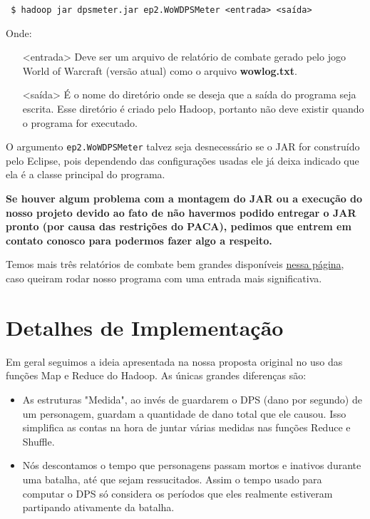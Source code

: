 \documentclass[a4paper,11pt]{article}
\begin{document}
  \begin{verbatim} $ hadoop jar dpsmeter.jar ep2.WoWDPSMeter <entrada> <saída> \end{verbatim}
  
  Onde:
  
  \begin{itemize}
    \item[<entrada>]
      Deve ser um arquivo de relatório de combate gerado pelo jogo World of
      Warcraft (versão atual) como o arquivo \textbf{wowlog.txt}.
    \item[<saída>]
      É o nome do diretório onde se deseja que a saída do programa seja escrita.
      Esse diretório é criado pelo Hadoop, portanto não deve existir quando o
      programa for executado.
  \end{itemize}
  
  O argumento \verb$ep2.WoWDPSMeter$ talvez seja desnecessário se o JAR for
  construído pelo Eclipse, pois dependendo das configurações usadas ele já deixa
  indicado que ela é a classe principal do programa.
  
  \textbf{
  Se houver algum problema com a montagem do JAR ou a execução do nosso projeto
  devido ao fato de não havermos podido entregar o JAR pronto (por causa das
  restrições do PACA), pedimos que entrem em contato conosco para podermos fazer
  algo a respeito.
  }
  
  Temos mais três relatórios de combate bem grandes disponíveis
  \href{http://www.linux.ime.usp.br/~gorobaum/logs/}{nessa página}, caso queiram
  rodar nosso programa com uma entrada mais significativa.
  
\section{Detalhes de Implementação}

  Em geral seguimos a ideia apresentada na nossa proposta original no uso das
  funções Map e Reduce do Hadoop. As únicas grandes diferenças são:
  
  \begin{itemize}
    \item
      As estruturas "Medida", ao invés de guardarem o DPS (dano por segundo) de
      um personagem, guardam a quantidade de dano total que ele causou. Isso
      simplifica as contas na hora de juntar várias medidas nas funções Reduce e
      Shuffle.
    \item
      Nós descontamos o tempo que personagens passam mortos e inativos durante
      uma batalha, até que sejam ressucitados. Assim o tempo usado para computar
      o DPS só considera os períodos que eles realmente estiveram partipando
      ativamente da batalha.
  \end{itemize}    
  
\end{document}
